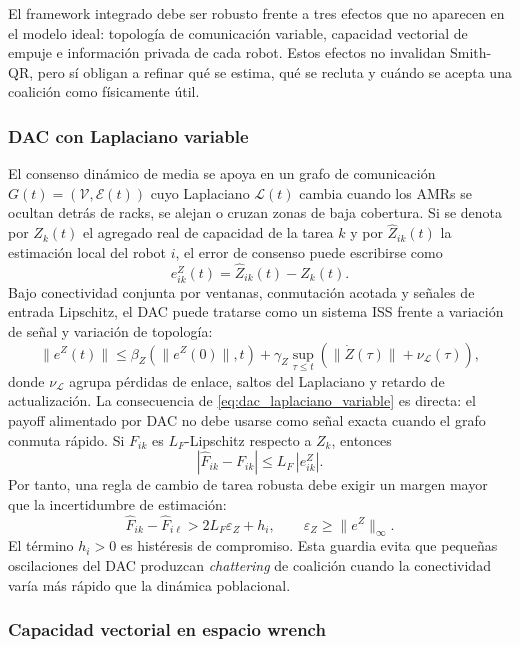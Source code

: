 El framework integrado debe ser robusto frente a tres efectos que no aparecen en el
modelo ideal: topología de comunicación variable, capacidad vectorial de empuje e
información privada de cada robot. Estos efectos no invalidan Smith-QR, pero sí obligan a
refinar qué se estima, qué se recluta y cuándo se acepta una coalición como físicamente
útil.

\subsubsection{DAC con Laplaciano variable}

El consenso dinámico de media se apoya en un grafo de comunicación
$G(t)=(\mathcal V,\mathcal E(t))$ cuyo Laplaciano $\mathcal L(t)$ cambia cuando los AMRs
se ocultan detrás de racks, se alejan o cruzan zonas de baja cobertura. Si se denota por
$Z_k(t)$ el agregado real de capacidad de la tarea $k$ y por $\widehat Z_{ik}(t)$ la
estimación local del robot $i$, el error de consenso puede escribirse como
\[
  e_{ik}^{Z}(t)=\widehat Z_{ik}(t)-Z_k(t).
\]
Bajo conectividad conjunta por ventanas, conmutación acotada y señales de entrada
Lipschitz, el DAC puede tratarse como un sistema ISS frente a variación de señal y
variación de topología:
\begin{equation}
  \|e^Z(t)\|
  \le
  \beta_Z(\|e^Z(0)\|,t)
  +
  \gamma_Z
  \sup_{\tau\le t}
  \left(
    \|\dot Z(\tau)\|+\nu_{\mathcal L}(\tau)
  \right),
  \label{eq:dac_laplaciano_variable}
\end{equation}
donde $\nu_{\mathcal L}$ agrupa pérdidas de enlace, saltos del Laplaciano y retardo de
actualización. La consecuencia de \eqref{eq:dac_laplaciano_variable} es directa: el
payoff alimentado por DAC no debe usarse como señal exacta cuando el grafo conmuta
rápido. Si $F_{ik}$ es $L_F$-Lipschitz respecto a $Z_k$, entonces
\[
  |\widehat F_{ik}-F_{ik}|\le L_F\,|e^Z_{ik}|.
\]
Por tanto, una regla de cambio de tarea robusta debe exigir un margen mayor que la
incertidumbre de estimación:
\begin{equation}
  \widehat F_{ik}-\widehat F_{i\ell}
  >
  2L_F\varepsilon_Z+h_i,
  \qquad
  \varepsilon_Z\ge\|e^Z\|_\infty .
  \label{eq:guardia_chattering_dac}
\end{equation}
El término $h_i>0$ es histéresis de compromiso. Esta guardia evita que pequeñas
oscilaciones del DAC produzcan \emph{chattering} de coalición cuando la conectividad
varía más rápido que la dinámica poblacional.

\subsubsection{Capacidad vectorial en espacio wrench}


